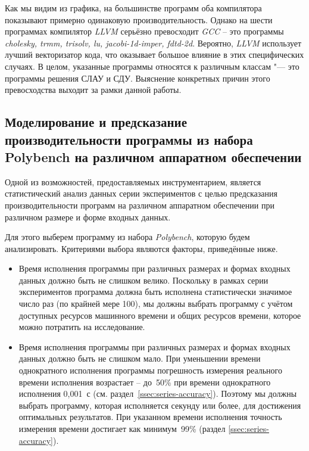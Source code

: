 \begin{figure}[tbp]
\end{figure}

Как мы видим из графика, на большинстве программ оба компилятора показывают примерно одинаковую производительность. Однако на шести программах компилятор \textit{LLVM} серьёзно превосходит \textit{GCC} -- это программы \textit{cholesky, trmm, trisolv, lu, jacobi-1d-imper, fdtd-2d}. Вероятно, \textit{LLVM} использует лучший векторизатор кода, что оказывает большое влияние в этих специфических случаях. В целом, указанные программы относятся к различным классам "--- это программы решения СЛАУ и СДУ. Выяснение конкретных причин этого превосходства выходит за рамки данной работы.

\subsection{Моделирование и предсказание производительности программы из набора Polybench на различном аппаратном обеспечении}

Одной из возможностей, предоставляемых инструментарием, является статистический анализ данных серии экспериментов с целью предсказания производительности программ на различном аппаратном обеспечении при различном размере и форме входных данных.

Для этого выберем программу из набора \textit{Polybench}, которую будем анализировать. Критериями выбора являются факторы, приведённые ниже.
\begin{itemize}
    \item Время исполнения программы при различных размерах и формах входных данных должно быть не слишком велико. Поскольку в рамках серии экспериментов программа должна быть исполнена статистически значимое число раз (по крайней мере 100), мы должны выбрать программу с учётом доступных ресурсов машинного времени и общих ресурсов времени, которое можно потратить на исследование.
    \item Время исполнения программы при различных размерах и формах входных данных должно быть не слишком мало. При уменьшении времени однократного исполнения программы погрешность измерения реального времени исполнения возрастает -- до~50\% при времени однократного исполнения 0,001~с (см. раздел~\ref{ssec:series-accuracy}). Поэтому мы должны выбрать программу, которая исполняется секунду или более, для достижения оптимальных результатов. При указанном времени исполнения точность измерения времени достигает как минимум~99\% (раздел \ref{ssec:series-accuracy}).
\end{itemize}

